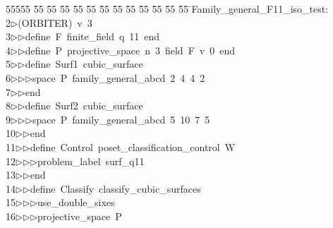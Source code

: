%
%
\begin{tabbing}
55555 \= 55 \= 55 \= 55 \= 55 \= 55 \= 55 \= 55 \= 55 \= 55 \= 55 \= 55 \= 55 \= \>Family\_general\_F11\_iso\_test:\\[0pt]
2\>$\triangleright$\>(ORBITER)\ v\ 3\ \\[0pt]
3\>$\triangleright$\>$\triangleright$\>define\ F\ finite\_field\ q\ 11\ end\ \\[0pt]
4\>$\triangleright$\>$\triangleright$\>define\ P\ projective\_space\ n\ 3\ field\ F\ v\ 0\ end\ \\[0pt]
5\>$\triangleright$\>$\triangleright$\>define\ Surf1\ cubic\_surface\ \\[0pt]
6\>$\triangleright$\>$\triangleright$\>$\triangleright$\>space\ P\ family\_general\_abcd\ 2\ 4\ 4\ 2\ \\[0pt]
7\>$\triangleright$\>$\triangleright$\>end\ \\[0pt]
8\>$\triangleright$\>$\triangleright$\>define\ Surf2\ cubic\_surface\ \\[0pt]
9\>$\triangleright$\>$\triangleright$\>$\triangleright$\>space\ P\ family\_general\_abcd\ 5\ 10\ 7\ 5\ \\[0pt]
10\>$\triangleright$\>$\triangleright$\>end\ \\[0pt]
11\>$\triangleright$\>$\triangleright$\>define\ Control\ poset\_classification\_control\ W\ \\[0pt]
12\>$\triangleright$\>$\triangleright$\>$\triangleright$\>problem\_label\ surf\_q11\ \\[0pt]
13\>$\triangleright$\>$\triangleright$\>end\ \\[0pt]
14\>$\triangleright$\>$\triangleright$\>define\ Classify\ classify\_cubic\_surfaces\ \\[0pt]
15\>$\triangleright$\>$\triangleright$\>$\triangleright$\>use\_double\_sixes\ \\[0pt]
16\>$\triangleright$\>$\triangleright$\>$\triangleright$\>projective\_space\ P\ \\[0pt]

\end{tabbing}

